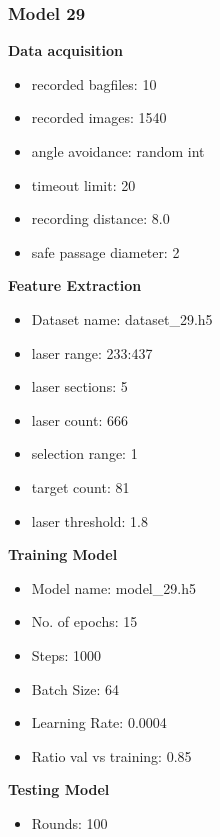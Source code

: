 \subsubsection{Model 29\label{model_29} }
\begin{multicols}{2}\textbf{Data acquisition}
\begin{itemize}
\setlength\itemsep{0.1em}
\item recorded bagfiles: 10
\item recorded images: 1540
\item angle avoidance: random int
\item timeout limit: 20
\item recording distance: 8.0
\item safe passage diameter: 2
\end{itemize}
\textbf{Feature Extraction}
\begin{itemize}
\setlength\itemsep{0.1em}
\item Dataset name: dataset\_29.h5
\item  laser range: 233:437
\item  laser sections: 5
\item  laser count: 666
\item  selection range: 1
\item  target count: 81
\item  laser threshold: 1.8
\end{itemize}
\columnbreak\textbf{Training Model}
\begin{itemize}
\setlength\itemsep{0.1em}
\item  Model name: model\_29.h5
\item  No. of epochs: 15
\item  Steps: 1000
\item  Batch Size: 64
\item  Learning Rate: 0.0004
\item  Ratio val vs training: 0.85
\end{itemize}
\textbf{Testing Model}
\begin{itemize}
\setlength\itemsep{0.1em}
\item Rounds: 100
\newline
\newline
\newline
\newline
\newline
\newline
\newline
\newline

\end{itemize}
\end{multicols}
